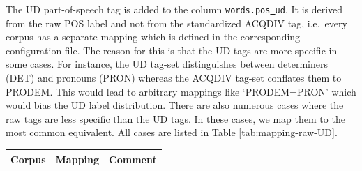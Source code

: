 \documentclass[a4paper, 11pt]{book}
\newcommand{\und}{\underline{{ }}\hspace{0.2mm}}	%
\begin{document}
\noindent The UD part-of-speech tag is added to the column \texttt{words.pos\und ud}. It is derived from the raw POS label and not from the standardized ACQDIV tag, i.e.\ every corpus has a separate mapping which is defined in the corresponding configuration file. The reason for this is that the UD tags are more specific in some cases. For instance, the UD tag-set distinguishes between determiners (DET) and pronouns (PRON) whereas the ACQDIV tag-set conflates them to PRODEM. This would lead to arbitrary mappings like `PRODEM=PRON' which would bias the UD label distribution. There are also numerous cases where the raw tags are less specific than the UD tags. In these cases, we map them to the most common equivalent. All cases are listed in Table \ref{tab:mapping-raw-UD}.

\begin{longtable}{lp{.2\linewidth}p{.5\linewidth}}
	\toprule
		\textbf{Corpus} & \textbf{Mapping} 	& \textbf{Comment} \\
	\midrule
	\endhead
		

\end{longtable}
\end{document}
